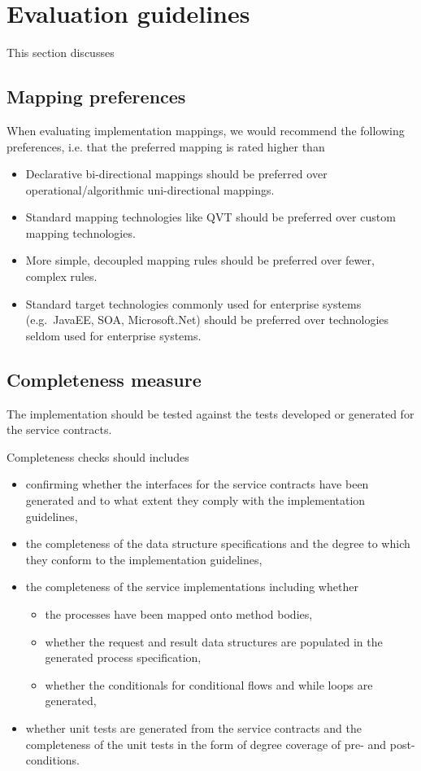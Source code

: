 \section{Evaluation guidelines}

This section discusses 

\subsection{Mapping preferences}

When evaluating implementation mappings, we would recommend the following preferences, i.e. that the preferred mapping is rated higher than 
\begin{itemize}
  \item Declarative bi-directional mappings should be preferred over operational/algorithmic uni-directional mappings. 
  \item Standard mapping technologies like QVT should be preferred over custom mapping technologies.
  \item More simple, decoupled mapping rules should be preferred over fewer, complex rules.
  \item Standard target technologies commonly used for enterprise systems (e.g.\ JavaEE, SOA, Microsoft.Net) should be preferred over technologies seldom used for enterprise systems.
\end{itemize}

\subsection{Completeness measure}
The implementation should be tested against the tests developed or generated for the service contracts. 

Completeness checks should includes
\begin{itemize}
  \item confirming whether the interfaces for the service contracts have been generated and to what extent they comply with the implementation guidelines,
  \item the completeness of the data structure specifications and the degree to which they conform to the implementation guidelines,
  \item the completeness of the service implementations including whether
    \begin{itemize}
     \item the processes have been mapped onto method bodies,
     \item whether the request and result data structures are populated in the generated process specification,
     \item whether the conditionals for conditional flows and while loops are generated,
    \end{itemize}
  \item whether unit tests are generated from the service contracts and the completeness of the unit tests in the form of degree coverage of pre- and post-conditions.
\end{itemize}

